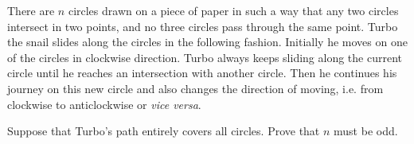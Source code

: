 There are $n$ circles drawn on a piece of paper in such a way that any two circles intersect in two points, and no three circles pass through the same point.
Turbo the snail slides along the circles in the following fashion.
Initially he moves on one of the circles in clockwise direction.
Turbo always keeps sliding along the current circle until he reaches an intersection with another circle.
Then he continues his journey on this new circle and also changes the direction of moving, i.e. from clockwise to anticlockwise or \textit{vice versa}.

Suppose that Turbo’s path entirely covers all circles. Prove that $n$ must be odd.
